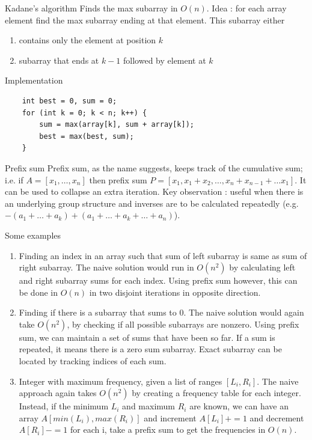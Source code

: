 \documentclass[titlepage, 12pt]{book}
\begin{document}
\begin{algorithm}{Kadane's algorithm}{}
    Finds the max subarray in $O(n)$. Idea : for each array element find the max
    subarray ending at that element. This subarray either
    \begin{enumerate}
        \item contains only the element at position $k$
        \item subarray that ends at $k - 1$ followed by element at $k$
    \end{enumerate}
    Implementation
    \begin{verbatim}
    int best = 0, sum = 0;
    for (int k = 0; k < n; k++) {
        sum = max(array[k], sum + array[k]);
        best = max(best, sum);
    }
    \end{verbatim}
\end{algorithm}

\begin{algorithm}{Prefix sum}{}
    Prefix sum, as the name suggests, keeps track of the cumulative sum; i.e. if
    $A =  [x_1,\dots,x_n]$ then prefix sum $P = [x_1, x_1 + x_2,\dots,x_n + x_{n
    - 1} + \dots x_1]$. It can be used to collapse an extra iteration. Key
    observation : useful when there is an underlying group structure and
    inverses are to be calculated repeatedly (e.g. $-(a_1+\dots+a_k) +
    (a_1+\dots+a_k+\dots+a_n)$).

    Some examples
    \begin{enumerate}
        \item Finding an index in an array such that sum of left subarray is
            same as sum of right subarray. The naive solution would run in
            $O(n^2)$ by calculating left and right subarray sums for each index.
            Using prefix sum however, this can be done in $O(n)$ in two disjoint
            iterations in opposite direction.
        \item Finding if there is a subarray that sums to 0. The naive solution
            would again take $O(n^2)$, by checking if all possible subarrays are
            nonzero. Using prefix sum, we can maintain a set of sums that have
            been so far. If a sum is repeated, it means there is a zero sum
            subarray. Exact subarray can be located by tracking indices of each
            sum.
        \item Integer with maximum frequency, given a list of ranges $[L_i,
            R_i]$. The naive approach again takes $O(n^2)$ by creating a
            frequency table for each integer. Instead, if the minimum $L_i$ and
            maximum $R_i$ are known, we can have an array $A[min(L_i),
            max(R_i)]$ and increment $A[L_i] += 1$ and decrement $A[R_i] -= 1$
            for each i, take a prefix sum to get the frequencies in $O(n)$.
    \end{enumerate}
\end{algorithm}
\end{document}
